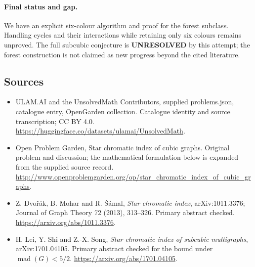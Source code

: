 \documentclass[11pt,a4paper]{article}
\begin{document}
\paragraph{Final status and gap.}
We have an explicit six-colour algorithm and proof for the forest subclass. Handling cycles and their interactions while retaining only six colours remains unproved. The full subcubic conjecture is \textbf{UNRESOLVED} by this attempt; the forest construction is not claimed as new progress beyond the cited literature.

\subsection{Sources}
\begin{itemize}
\item[S1] ULAM.AI and the UnsolvedMath Contributors, supplied problems.json, catalogue entry, OpenGarden collection. Catalogue identity and source transcription; CC BY 4.0.
\url{https://huggingface.co/datasets/ulamai/UnsolvedMath}.
\item[S2] Open Problem Garden, Star chromatic index of cubic graphs. Original problem and discussion; the mathematical formulation below is expanded from the supplied source record.
\url{http://www.openproblemgarden.org/op/star_chromatic_index_of_cubic_graphs}.
\item[R1] Z. Dvořák, B. Mohar and R. Šámal, \emph{Star chromatic index}, arXiv:1011.3376; Journal of Graph Theory 72 (2013), 313--326. Primary abstract checked.
\url{https://arxiv.org/abs/1011.3376}.
\item[R2] H. Lei, Y. Shi and Z.-X. Song, \emph{Star chromatic index of subcubic multigraphs}, arXiv:1701.04105. Primary abstract checked for the bound under $\operatorname{mad}(G)<5/2$.
\url{https://arxiv.org/abs/1701.04105}.
\end{itemize}
\end{document}
